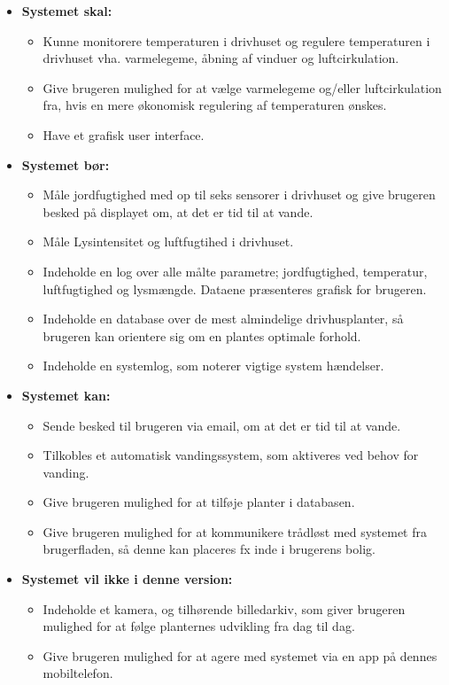 \begin{itemize}
	\item \textbf{Systemet skal:}
		\begin{itemize}
			\item Kunne monitorere temperaturen i drivhuset og regulere temperaturen i drivhuset vha. varmelegeme, åbning af vinduer og luftcirkulation.
			\item Give brugeren mulighed for at vælge varmelegeme og/eller luftcirkulation fra, hvis en mere økonomisk regulering af temperaturen ønskes. 
			\item Have et grafisk user interface.
		\end{itemize}
	\item \textbf{Systemet bør:}
		\begin{itemize}
			\item Måle jordfugtighed med op til seks sensorer i drivhuset og give brugeren besked på displayet om, at det er tid til at vande. 
			\item Måle Lysintensitet og luftfugtihed i drivhuset.
			\item Indeholde en log over alle målte parametre; jordfugtighed, temperatur, luftfugtighed og lysmængde. 
			Dataene præsenteres grafisk for brugeren.
			\item Indeholde en database over de mest almindelige drivhusplanter, så brugeren kan orientere sig om en plantes optimale forhold.
			\item Indeholde en systemlog, som noterer vigtige system hændelser.
		\end{itemize}
	\item \textbf{Systemet kan:}
		\begin{itemize}
			\item Sende besked til brugeren via email, om at det er tid til at vande.
			\item Tilkobles et automatisk vandingssystem, som aktiveres ved behov for vanding. 
			\item Give brugeren mulighed for at tilføje planter i databasen.
			\item Give brugeren mulighed for at kommunikere trådløst med systemet fra brugerfladen, så denne kan placeres fx inde i brugerens bolig. 
		\end{itemize}
	\item \textbf{Systemet vil ikke i denne version:}	
		\begin{itemize}
			\item Indeholde et kamera, og tilhørende billedarkiv, som giver brugeren mulighed for at følge planternes udvikling fra dag til dag. 
			\item Give brugeren mulighed for at agere med systemet via en app på dennes mobiltelefon. 
		\end{itemize}
\end{itemize}
\clearpage

